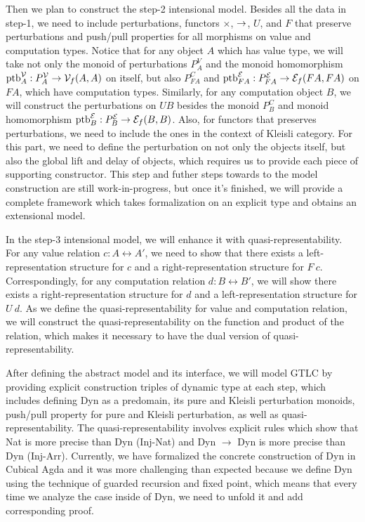 Then we plan to construct the step-2 intensional model. Besides all the 
data in step-1, we need to include perturbations, functors $\times$, $\to$, $U$, and $F$ that preserve 
perturbations and push/pull properties for all morphisms on value and 
computation types. Notice that for any object $A$ which has value type, 
we will take not only the monoid of perturbations $P^V_A$ and the monoid 
homomorphism $\text{ptb}^\mathcal{V}_A : P^{\mathcal{V}}_A \to \mathcal{V}_f(A,A)$ on itself, but also $P^C_{F A}
$ and $\text{ptb}^\mathcal{E}_{F A} : P^{\mathcal{E}}_{F A} \to \mathcal{E}_f(F A,F A)$ on $F A$, which have 
computation types. Similarly, for any computation object $B$, we will 
construct the perturbations on $U B$ besides the monoid $P^C_B$ and 
monoid homomorphism $\text{ptb}^\mathcal{E}_B : P^{\mathcal{E}}_B \to \mathcal{E}_f(B,B)$. Also, for functors 
that preserves perturbations, we need to include the ones in the context 
of Kleisli category. For this part, we need to define the perturbation on 
not only the objects itself, but also the global lift and delay of objects, 
which requires us to provide each piece of supporting constructor. This step 
and futher steps towards to the model construction are still 
work-in-progress, but once it's finished, we will provide a complete 
framework which takes formalization on an explicit type and obtains an 
extensional model.

In the step-3 intensional model, we will enhance it with 
quasi-representability. For any value relation $c : A \rel A'$, we need 
to show that there exists a left-representation structure for $c$ and a 
right-representation structure for $F\ c$. Correspondingly, for any 
computation relation $d : B \rel B'$, we will show there exists a 
right-representation structure for $d$ and a left-representation 
structure for $U\ d$. As we define the quasi-representability for value 
and computation relation, we will construct the quasi-representability on 
the function and product of the relation, which makes it necessary to 
have the dual version of quasi-representability.

After defining the abstract model and its interface, we will model GTLC 
by providing explicit construction triples of dynamic type at each step, 
which includes defining Dyn as a predomain, its pure and Kleisli 
perturbation monoids, push/pull property for pure and Kleisli 
perturbation, as well as quasi-representability. The 
quasi-representability involves explicit rules which show that Nat is 
more precise than Dyn (Inj-Nat) and Dyn $\to$ Dyn is more precise than 
Dyn (Inj-Arr). Currently, we have formalized the concrete construction of 
Dyn in Cubical Agda and it was more challenging than expected because we 
define Dyn using the technique of guarded recursion and fixed point, which 
means that every time we analyze the case inside of Dyn, we need to unfold 
it and add corresponding proof. 

